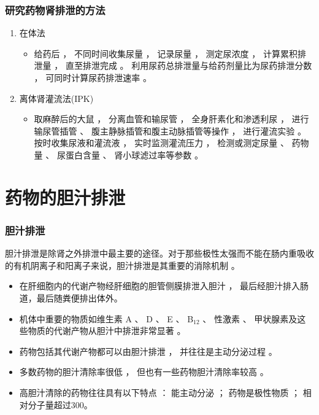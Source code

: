 \documentclass[dvipsnames, svgnames, x11names]{beamer}
\begin{document}
\begin{frame}
    \frametitle{研究药物肾排泄的方法}
    \begin{enumerate}
      \item 在体法
        \begin{itemize}
          \item 给药后 ， 不同时间收集尿量 ， 记录尿量 ， 测定尿浓度 ， 计算累积排泄量 ， 直至排泄完成 。 利用尿药总排泄量与给药剂量比为尿药排泄分数 ， 可同时计算尿药排泄速率 。
        \end{itemize}
      \item 离体肾灌流法(IPK)
        \begin{itemize}
          \item 取麻醉后的大鼠 ， 分离血管和输尿管 ， 全身肝素化和渗透利尿 ， 进行输尿管插管 、 腹主静脉插管和腹主动脉插管等操作 ， 进行灌流实验 。 按时收集尿液和灌流液 ， 实时监测灌流压力 ， 检测或测定尿量 、 药物量 、 尿蛋白含量 、 肾小球滤过率等参数 。%
        \end{itemize}
    \end{enumerate}
\end{frame}


\section{药物的胆汁排泄}


\begin{frame}
    \frametitle{胆汁排泄}
    胆汁排泄是除肾之外排泄中最主要的途径。对于那些极性太强而不能在肠内重吸收的有机阴离子和阳离子来说，胆汁排泄是其重要的消除机制 。
    \begin{itemize}
      \item 在肝细胞内的代谢产物经肝细胞的胆管侧膜排泄入胆汁 ， 最后经胆汁排入肠道，最后随粪便排出体外。
      \item 机体中重要的物质如维生素 A 、 D 、 E 、 B$_{12}$ 、 性激素 、 甲状腺素及这些物质的代谢产物从胆汁中排泄非常显著 。
      \item 药物包括其代谢产物都可以由胆汁排泄 ， 并往往是主动分泌过程 。
      \item 多数药物的胆汁清除率很低 ， 但也有一些药物胆汁清除率较高 。
      \item 高胆汁清除的药物往往具有以下特点 ： 能主动分泌 ； 药物是极性物质 ； 相对分子量超过300。
    \end{itemize}
\end{frame}
\end{document}
